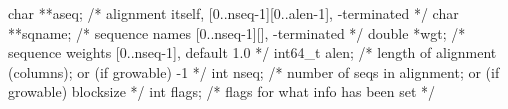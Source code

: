 \begin{cchunk}
  char  **aseq;       /* alignment itself, [0..nseq-1][0..alen-1], \0-terminated */
  char  **sqname;     /* sequence names [0..nseq-1][], \0-terminated             */
  double *wgt;        /* sequence weights [0..nseq-1], default 1.0               */
  int64_t alen;       /* length of alignment (columns); or (if growable) -1      */
  int     nseq;       /* number of seqs in alignment; or (if growable) blocksize */
  int     flags;      /* flags for what info has been set                        */
\end{cchunk}
